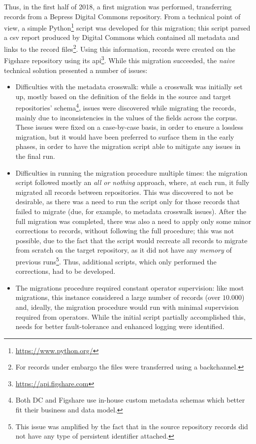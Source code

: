 Thus, in the first half of 2018, a first migration was performed, transferring records from a Bepress Digital Commons repository. From a technical point of view, a simple Python\footnote{\url{https://www.python.org/}} script was developed for this migration; this script parsed a \gls{csv} report produced by Digital Commons\cite{bepressdash} which contained all metadata and links to the record files\footnote{For records under embargo the files were transferred using a backchannel.}. Using this information, records were created on the Figshare repository using its \gls{api}\footnote{\url{https://api.figshare.com}}. While this migration succeeded, the \emph{naive} technical solution presented a number of issues:
\begin{itemize}
    \item Difficulties with the metadata crosswalk: while a crosswalk was initially set up, mostly based on the definition of the fields in the source and target repositories' schema\footnote{Both DC and Figshare use in-house custom metadata schemas which better fit their business and data model.}, issues were discovered while migrating the records, mainly due to inconsistencies in the values of the fields across the corpus. These issues were fixed on a case-by-case basis, in order to ensure a lossless migration, but it would have been preferred to surface them in the early phases, in order to have the migration script able to mitigate any issues in the final run.
    \item Difficulties in running the migration procedure multiple times: the migration script followed mostly an \emph{all or nothing} approach, where, at each run, it fully migrated all records between repositories. This was discovered to not be desirable, as there was a need to run the script only for those records that failed to migrate (due, for example, to metadata crosswalk issues). After the full migration was completed, there was also a need to apply only some minor corrections to records, without following the full procedure; this was not possible, due to the fact that the script would recreate all records to migrate from scratch on the target repository, as it did not have any \emph{memory} of previous runs\footnote{This issue was amplified by the fact that in the source repository records did not have any type of persistent identifier attached.}. Thus, additional scripts, which only performed the corrections, had to be developed.
    \item The migrations procedure required constant operator supervision: like most migrations, this instance considered a large number of records (over $10.000$) and, ideally, the migration procedure would run with minimal supervision required from operators. While the initial script partially accomplished this, needs for better fault-tolerance and enhanced logging were identified.
\end{itemize}

